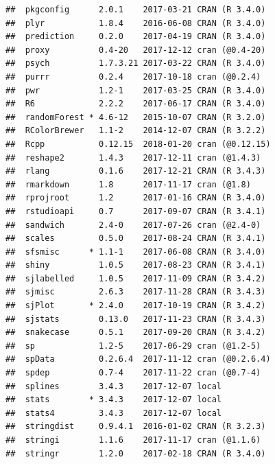 \documentclass[]{book}
\theoremstyle{definition}
\theoremstyle{definition}
\theoremstyle{definition}
\theoremstyle{remark}
\begin{document}
\begin{verbatim}
##  pkgconfig      2.0.1    2017-03-21 CRAN (R 3.4.0)                        
##  plyr           1.8.4    2016-06-08 CRAN (R 3.4.0)                        
##  prediction     0.2.0    2017-04-19 CRAN (R 3.4.0)                        
##  proxy          0.4-20   2017-12-12 cran (@0.4-20)                        
##  psych          1.7.3.21 2017-03-22 CRAN (R 3.4.0)                        
##  purrr          0.2.4    2017-10-18 cran (@0.2.4)                         
##  pwr            1.2-1    2017-03-25 CRAN (R 3.4.0)                        
##  R6             2.2.2    2017-06-17 CRAN (R 3.4.0)                        
##  randomForest * 4.6-12   2015-10-07 CRAN (R 3.2.0)                        
##  RColorBrewer   1.1-2    2014-12-07 CRAN (R 3.2.2)                        
##  Rcpp           0.12.15  2018-01-20 cran (@0.12.15)                       
##  reshape2       1.4.3    2017-12-11 cran (@1.4.3)                         
##  rlang          0.1.6    2017-12-21 CRAN (R 3.4.3)                        
##  rmarkdown      1.8      2017-11-17 cran (@1.8)                           
##  rprojroot      1.2      2017-01-16 CRAN (R 3.4.0)                        
##  rstudioapi     0.7      2017-09-07 CRAN (R 3.4.1)                        
##  sandwich       2.4-0    2017-07-26 cran (@2.4-0)                         
##  scales         0.5.0    2017-08-24 CRAN (R 3.4.1)                        
##  sfsmisc      * 1.1-1    2017-06-08 CRAN (R 3.4.0)                        
##  shiny          1.0.5    2017-08-23 CRAN (R 3.4.1)                        
##  sjlabelled     1.0.5    2017-11-09 CRAN (R 3.4.2)                        
##  sjmisc         2.6.3    2017-11-28 CRAN (R 3.4.3)                        
##  sjPlot       * 2.4.0    2017-10-19 CRAN (R 3.4.2)                        
##  sjstats        0.13.0   2017-11-23 CRAN (R 3.4.3)                        
##  snakecase      0.5.1    2017-09-20 CRAN (R 3.4.2)                        
##  sp             1.2-5    2017-06-29 cran (@1.2-5)                         
##  spData         0.2.6.4  2017-11-12 cran (@0.2.6.4)                       
##  spdep          0.7-4    2017-11-22 cran (@0.7-4)                         
##  splines        3.4.3    2017-12-07 local                                 
##  stats        * 3.4.3    2017-12-07 local                                 
##  stats4         3.4.3    2017-12-07 local                                 
##  stringdist     0.9.4.1  2016-01-02 CRAN (R 3.2.3)                        
##  stringi        1.1.6    2017-11-17 cran (@1.1.6)                         
##  stringr        1.2.0    2017-02-18 CRAN (R 3.4.0)                        

\end{verbatim}
\end{document}
